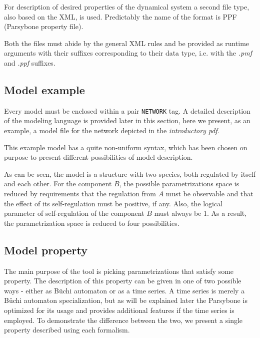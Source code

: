 \documentclass[12pt]{article}
\begin{document}
For description of desired properties of the dynamical system a second file type, also based on the XML, is used. Predictably the name of the format is PPF (Parsybone property file).

Both the files must abide by the general XML rules and be provided as runtime arguments with their suffixes corresponding to their data type, i.e. with the \emph{.pmf} and \emph{.ppf} suffixes.

\subsection{Model example}
Every model must be enclosed within a pair \texttt{NETWORK} tag. A detailed description of the modeling language is provided later in this section, here we present, as an example, a model file for the network depicted in the \emph{introductory pdf}. 

This example model has a quite non-uniform syntax, which has been chosen on purpose to present different possibilities of model description.
\begin{alltt}

\end{alltt}
As can be seen, the model is a structure with two species, both regulated by itself and each other. For the component $B$, the possible parametrizations space is reduced by requirements that the regulation from $A$ must be observable and that the effect of its self-regulation must be positive, if any. Also, the logical parameter of self-regulation of the component $B$ must always be 1. As a result, the parametrization space is reduced to four possibilities.

\subsection{Model property}
The main purpose of the tool is picking parametrizations that satisfy some property. The description of this property can be given in one of two possible ways - either as B\"uchi automaton or as a time series. A time series is merely a B\"uchi automaton specialization, but as will be explained later the Parsybone is optimized for its usage and provides additional features if the time series is employed. To demonstrate the difference between the two, we present a single property described using each formalism. 
\end{document}
